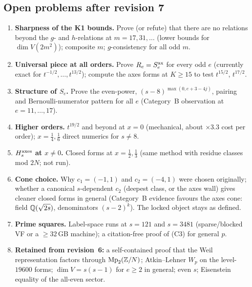 \subsection{Open problems after revision 7}\label{sec:open7}
\begin{enumerate}[leftmargin=2em]
\item \textbf{Sharpness of the K1 bounds.} Prove (or refute) that there are no relations beyond the $g$- and $h$-relations at $m=17,31,\dots$ (lower bounds for $\dim V(2m^2)$); composite $m$; $g$-consistency for all odd $m$.
\item \textbf{Universal piece at all orders.} Prove $R_e=S^{\rm ax}_e$ for every odd $e$ (currently exact for $t^{-1/2},\dots,t^{13/2}$); compute the axes forms at $K\ge15$ to test $t^{15/2}$, $t^{17/2}$.
\item \textbf{Structure of $S_e$.} Prove the even-power, $(s-8)^{\max(0,e+3-4j)}$, pairing and Bernoulli-numerator pattern for all $e$ (Category~B observation at $e=11,\dots,17$).
\item \textbf{Higher orders.} $t^{19/2}$ and beyond at $x=0$ (mechanical, about $\times3.3$ cost per order); $x=\tfrac14,\tfrac16$ direct numerics for $s\ne8$.
\item \textbf{$H_s^{\rm axes}$ at $x\neq0$.} Closed forms at $x=\tfrac12,\tfrac13$ (same method with residue classes mod $2N$; not run).
\item \textbf{Cone choice.} Why $c_1=(-1,1)$ and $c_2=(-4,1)$ were chosen originally; whether a canonical $s$-dependent $c_2$ (deepest class, or the axes wall) gives cleaner closed forms in general (Category~B evidence favours the axes cone: field $\mathbb{Q}(\sqrt{2s})$, denominators $(s-2)^k$). The locked object stays as defined.
\item \textbf{Prime squares.} Label-space runs at $s=121$ and $s=3481$ (sparse/blocked VF or a $\ge32$\,GB machine); a citation-free proof of (C3) for general $p$.
\item \textbf{Retained from revision~6:} a self-contained proof that the Weil representation factors through $\mathrm{Mp}_2(\mathbb{Z}/N)$; Atkin--Lehner $W_p$ on the level-$19600$ forms; $\dim V=s(s-1)$ for $e\ge2$ in general; even $s$; Eisenstein equality of the all-even sector.
\end{enumerate}
